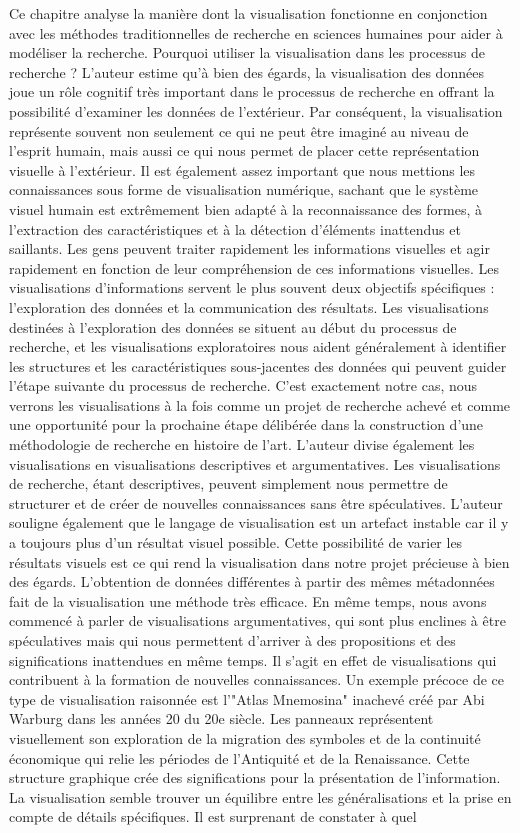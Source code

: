 \documentclass[a4paper, twoside, 12pt]{book}
\begin{document}
Ce chapitre analyse la manière dont la visualisation fonctionne en conjonction avec les méthodes traditionnelles de recherche en sciences humaines pour aider à modéliser la recherche. Pourquoi utiliser la visualisation dans les processus de recherche ? L'auteur estime qu'à bien des égards, la visualisation des données joue un rôle cognitif très important dans le processus de recherche en offrant la possibilité d'examiner les données de l'extérieur. Par conséquent, la visualisation représente souvent non seulement ce qui ne peut être imaginé au niveau de l'esprit humain, mais aussi ce qui nous permet de placer cette représentation visuelle à l'extérieur. Il est également assez important que nous mettions les connaissances sous forme de visualisation numérique, sachant que le système visuel humain est extrêmement bien adapté à la reconnaissance des formes, à l'extraction des caractéristiques et à la détection d'éléments inattendus et saillants. Les gens peuvent traiter rapidement les informations visuelles et agir rapidement en fonction de leur compréhension de ces informations visuelles. Les visualisations d'informations servent le plus souvent deux objectifs spécifiques : l'exploration des données et la communication des résultats.  Les visualisations destinées à l'exploration des données se situent au début du processus de recherche, et les visualisations exploratoires nous aident généralement à identifier les structures et les caractéristiques sous-jacentes des données qui peuvent guider l'étape suivante du processus de recherche. C'est exactement notre cas, nous verrons les visualisations à la fois comme un projet de recherche achevé et comme une opportunité pour la prochaine étape délibérée dans la construction d'une méthodologie de recherche en histoire de l'art. L'auteur divise également les visualisations en visualisations descriptives et argumentatives. Les visualisations de recherche, étant descriptives, peuvent simplement nous permettre de structurer et de créer de nouvelles connaissances sans être spéculatives. L'auteur souligne également que le langage de visualisation est un artefact instable car il y a toujours plus d'un résultat visuel possible. Cette possibilité de varier les résultats visuels est ce qui rend la visualisation dans notre projet précieuse à bien des égards. L'obtention de données différentes à partir des mêmes métadonnées fait de la visualisation une méthode très efficace. En même temps, nous avons commencé à parler de visualisations argumentatives, qui sont plus enclines à être spéculatives mais qui nous permettent d'arriver à des propositions et des significations inattendues en même temps. Il s'agit en effet de visualisations qui contribuent à la formation de nouvelles connaissances. Un exemple précoce de ce type de visualisation raisonnée est l'"Atlas Mnemosina" inachevé créé par Abi Warburg dans les années 20 du 20e siècle. Les panneaux représentent visuellement son exploration de la migration des symboles et de la continuité économique qui relie les périodes de l'Antiquité et de la Renaissance. Cette structure graphique crée des significations pour la présentation de l'information. La visualisation semble trouver un équilibre entre les généralisations et la prise en compte de détails spécifiques. Il est surprenant de constater à quel 
\end{document}
